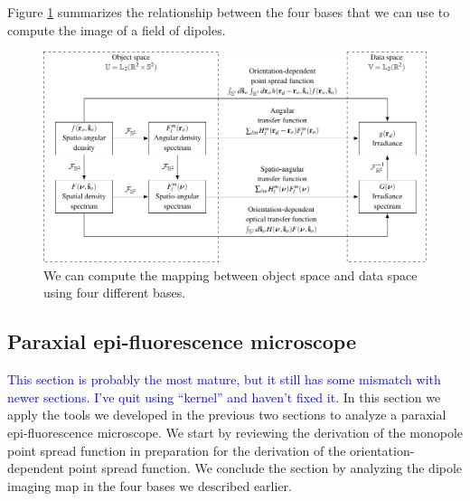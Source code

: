 \documentclass{osa-article}
\providecommand{\tb}[1]{\textcolor{blue}{#1}}
\begin{document}
  Figure \ref{fig:dipole-block} summarizes the relationship between the four
  bases that we can use to compute the image of a field of dipoles.
    
\begin{figure}
  \hspace{-5em}
  \includegraphics[scale=1.0]{../figures/dipole-block/dipole-block.pdf}
  \caption{We can compute the mapping between object space and data space using
    four different bases.}
   \label{fig:dipole-block}      
    \end{figure}

\subsection{Paraxial epi-fluorescence microscope}\label{sec:para}
\tb{This section is probably the most mature, but it still has some mismatch with
  newer sections. I've quit using ``kernel'' and haven't fixed it.}
In this section we apply the tools we developed in the previous two sections to
analyze a paraxial epi-fluorescence microscope. We start by reviewing the
derivation of the monopole point spread function in preparation for the
derivation of the orientation-dependent point spread function. We conclude the
section by analyzing the dipole imaging map in the four bases we described
earlier.
\end{document}
